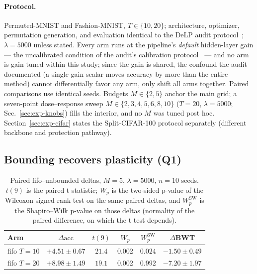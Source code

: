 \documentclass[review,12pt,number]{elsarticle}
\newcommand{\delp}{DeLP}
\newcommand{\acc}{\mathrm{acc}}
\begin{document}
\paragraph{Protocol.}
Permuted-MNIST and Fashion-MNIST, $T \in \{10, 20\}$; architecture,
optimizer, permutation generation, and evaluation identical to the
\delp{} audit protocol~\cite{zhou2026delp}; $\lambda{=}5000$ unless stated. Every arm runs at the pipeline's
\emph{default} hidden-layer gain --- the uncalibrated condition of the
audit's calibration protocol~\cite{zhou2026delp} --- and no arm is
gain-tuned within this study; since the gain is shared, the confound
the audit documented (a single gain scalar moves accuracy by more than
the entire method) cannot differentially favor any arm, only shift all
arms together. Paired comparisons use identical seeds.
Budgets $M \in \{2, 5\}$ anchor the main grid; a seven-point
dose--response sweep $M \in \{2,3,4,5,6,8,10\}$ ($T{=}20$,
$\lambda{=}5000$; Sec.~\ref{sec:exp-knobs}) fills the interior, and no
$M$ was tuned post hoc.
Section~\ref{sec:exp-cifar} states the Split-CIFAR-100 protocol
separately (different backbone and protection pathway).

\subsection{Bounding recovers plasticity (Q1)}
\label{sec:exp-main}

\begin{table}[t]
\centering\small
\caption{Paired fifo--unbounded deltas, $M{=}5$, $\lambda{=}5000$,
$n{=}10$ seeds. $t(9)$ is the paired t statistic; $W_p$ is the
two-sided p-value of the Wilcoxon signed-rank test on the same paired
deltas, and $W_p^{\mathrm{SW}}$ is the Shapiro--Wilk p-value on those
deltas (normality of the paired difference, on which the t test
depends).}
\label{tab:paired}
\begin{tabular}{lccccc}
\toprule
Arm & $\Delta\acc$ & $t(9)$ & $W_p$ & $W_p^{\mathrm{SW}}$ & $\Delta$BWT \\
\midrule
fifo $T{=}10$ & $+4.51\pm0.67$ & $21.4$ & $0.002$ & $0.024$ & $-1.50\pm0.49$ \\
fifo $T{=}20$ & $+8.98\pm1.49$ & $19.1$ & $0.002$ & $0.992$ & $-7.20\pm1.97$ \\
\bottomrule
\end{tabular}
\end{table}
\end{document}
